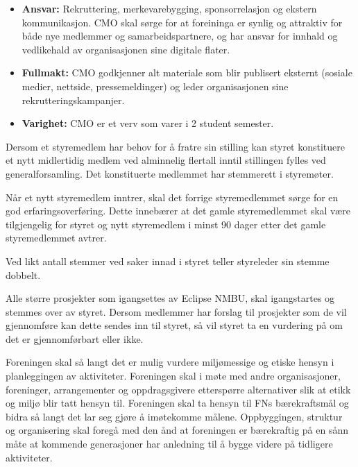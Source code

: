 \documentclass{rapport}
\begin{document}
\begin{itemize}
  \item \textbf{Ansvar:} Rekruttering, merkevarebygging, sponsorrelasjon og ekstern
        kommunikasjon. CMO skal sørge for at foreininga er synlig og attraktiv for både nye
        medlemmer og samarbeidspartnere, og har ansvar for innhald og vedlikehald av
        organisasjonen sine digitale flater.
  \item \textbf{Fullmakt:} CMO godkjenner alt materiale som blir publisert eksternt (sosiale medier,
        nettside, pressemeldinger) og leder organisasjonen sine rekrutteringskampanjer.
  \item \textbf{Varighet:} CMO er et verv som varer i 2 student semester.
\end{itemize}

Dersom et styremedlem har behov for å fratre sin stilling kan styret konstituere et nytt
midlertidig medlem ved alminnelig flertall inntil stillingen fylles ved generalforsamling. Det
konstituerte medlemmet har stemmerett i styremøter.

Når et nytt styremedlem inntrer, skal det forrige styremedlemmet sørge for en god
erfaringsoverføring. Dette innebærer at det gamle styremedlemmet skal være tilgjengelig for
styret og nytt styremedlem i minst 90 dager etter det gamle styremedlemmet avtrer.

Ved likt antall stemmer ved saker innad i styret teller styreleder sin stemme dobbelt.


Alle større prosjekter som igangsettes av Eclipse NMBU, skal igangstartes og
stemmes over av styret. Dersom medlemmer har forslag til prosjekter som de vil
gjennomføre kan dette sendes inn til styret, så vil styret ta en vurdering på om
det er gjennomførbart eller ikke.


Foreningen skal så langt det er mulig vurdere miljømessige og etiske hensyn i planleggingen
av aktiviteter. Foreningen skal i møte med andre organisasjoner, foreninger, arrangementer
og oppdragsgivere etterspørre alternativer slik at etikk og miljø blir tatt hensyn til.
Foreningen skal ta hensyn til FNs bærekraftsmål og bidra så langt det lar seg gjøre å
imøtekomme målene. Oppbyggingen, struktur og organisering skal foregå med den ånd at
foreningen er bærekraftig på en sånn måte at kommende generasjoner har anledning til å
bygge videre på tidligere aktiviteter.
\end{document}
